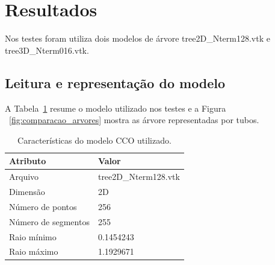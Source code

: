\section{Resultados}

Nos testes foram utiliza dois modelos de árvore tree2D\_Nterm128.vtk e tree3D\_Nterm016.vtk.

\subsection{Leitura e representação do modelo}
A Tabela~\ref{tab:modelo} resume o modelo utilizado nos testes e a Figura ~\ref{fig:comparacao_arvores} mostra as árvore representadas por tubos.

\begin{table}[!h]
  \centering\small
  \caption{Características do modelo CCO utilizado.}
  \label{tab:modelo}
  \begin{tabular}{ll}
    \toprule
    \textbf{Atributo} & \textbf{Valor}\\
    \midrule
    Arquivo & tree2D\_Nterm128.vtk\\
    Dimensão & 2D\\
    Número de pontos & 256\\
    Número de segmentos & 255\\
    Raio mínimo & 0.1454243\\
    Raio máximo & 1.1929671\\
    \bottomrule
  \end{tabular}
\end{table}

